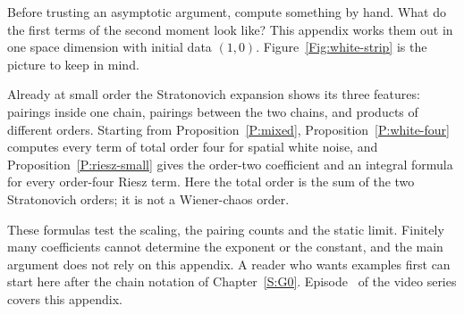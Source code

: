 Before trusting an asymptotic argument, compute something by hand. What do the
first terms of the second moment look like? This appendix works them out in
one space dimension with initial data $(1,0)$. Figure~\ref{Fig:white-strip}
is the picture to keep in mind.

Already at small order the Stratonovich expansion shows its three
features: pairings inside one chain, pairings between the two chains,
and products of different orders. Starting from Proposition~\ref{P:mixed},
Proposition~\ref{P:white-four} computes every term of total order four for
spatial white noise, and Proposition~\ref{P:riesz-small} gives the order-two
coefficient and an integral formula for every order-four Riesz term. Here
the total order is the sum of the two Stratonovich orders; it is not a
Wiener-chaos order.

These formulas test the scaling, the pairing counts and the static
limit. Finitely many coefficients cannot determine the exponent or the
constant, and the main argument does not rely on this appendix. A reader
who wants examples first can start here after the chain notation of
Chapter~\ref{S:G0}. Episode~ of the video series
covers this appendix.
